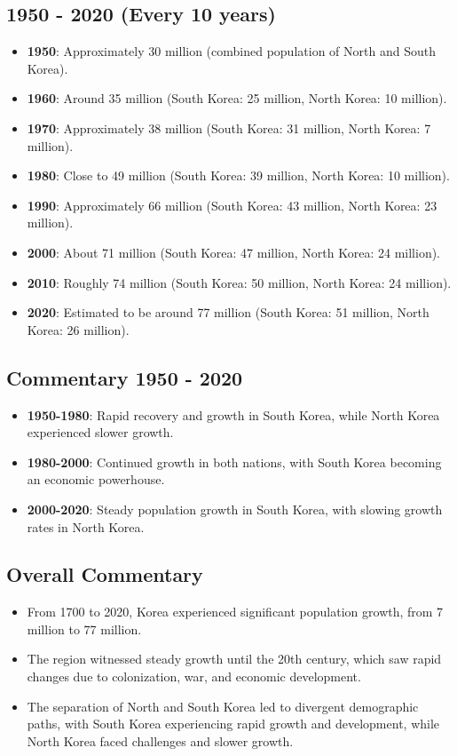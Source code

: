 \subsection*{1950 - 2020 (Every 10 years)}
\begin{itemize}
    \item \textbf{1950}: Approximately 30 million (combined population of North and South Korea).
    \item \textbf{1960}: Around 35 million (South Korea: 25 million, North Korea: 10 million).
    \item \textbf{1970}: Approximately 38 million (South Korea: 31 million, North Korea: 7 million).
    \item \textbf{1980}: Close to 49 million (South Korea: 39 million, North Korea: 10 million).
    \item \textbf{1990}: Approximately 66 million (South Korea: 43 million, North Korea: 23 million).
    \item \textbf{2000}: About 71 million (South Korea: 47 million, North Korea: 24 million).
    \item \textbf{2010}: Roughly 74 million (South Korea: 50 million, North Korea: 24 million).
    \item \textbf{2020}: Estimated to be around 77 million (South Korea: 51 million, North Korea: 26 million).
\end{itemize}

\subsection*{Commentary 1950 - 2020}
\begin{itemize}
    \item \textbf{1950-1980}: Rapid recovery and growth in South Korea, while North Korea experienced slower growth.
    \item \textbf{1980-2000}: Continued growth in both nations, with South Korea becoming an economic powerhouse.
    \item \textbf{2000-2020}: Steady population growth in South Korea, with slowing growth rates in North Korea.
\end{itemize}

\subsection*{Overall Commentary}
\begin{itemize}
    \item From 1700 to 2020, Korea experienced significant population growth, from 7 million to 77 million.
    \item The region witnessed steady growth until the 20th century, which saw rapid changes due to colonization, war, and economic development.
    \item The separation of North and South Korea led to divergent demographic paths, with South Korea experiencing rapid growth and development, while North Korea faced challenges and slower growth.
\end{itemize}
